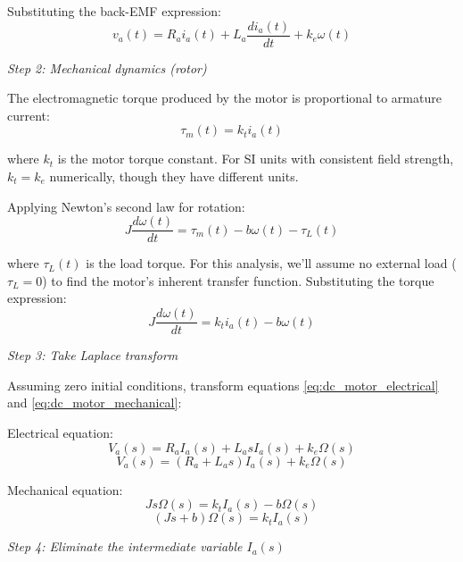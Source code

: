 \begin{example}
Substituting the back-EMF expression:
\begin{equation}
v_a(t) = R_a i_a(t) + L_a \frac{d i_a(t)}{dt} + k_e \omega(t)
\label{eq:dc_motor_electrical}
\end{equation}

\textit{Step 2: Mechanical dynamics (rotor)}

The electromagnetic torque produced by the motor is proportional to armature current:
\begin{equation}
\tau_m(t) = k_t i_a(t)
\end{equation}

where $k_t$ is the motor torque constant. For SI units with consistent field strength, $k_t = k_e$ numerically, though they have different units.

Applying Newton's second law for rotation:
\begin{equation}
J \frac{d\omega(t)}{dt} = \tau_m(t) - b\omega(t) - \tau_L(t)
\end{equation}

where $\tau_L(t)$ is the load torque. For this analysis, we'll assume no external load ($\tau_L = 0$) to find the motor's inherent transfer function. Substituting the torque expression:
\begin{equation}
J \frac{d\omega(t)}{dt} = k_t i_a(t) - b\omega(t)
\label{eq:dc_motor_mechanical}
\end{equation}

\textit{Step 3: Take Laplace transform}

Assuming zero initial conditions, transform equations \eqref{eq:dc_motor_electrical} and \eqref{eq:dc_motor_mechanical}:

Electrical equation:
\begin{equation}
V_a(s) = R_a I_a(s) + L_a s I_a(s) + k_e \Omega(s)
\end{equation}
\begin{equation}
V_a(s) = (R_a + L_a s) I_a(s) + k_e \Omega(s)
\label{eq:dc_motor_electrical_laplace}
\end{equation}

Mechanical equation:
\begin{equation}
J s \Omega(s) = k_t I_a(s) - b\Omega(s)
\end{equation}
\begin{equation}
(Js + b) \Omega(s) = k_t I_a(s)
\label{eq:dc_motor_mechanical_laplace}
\end{equation}

\textit{Step 4: Eliminate the intermediate variable $I_a(s)$}


\end{example}
